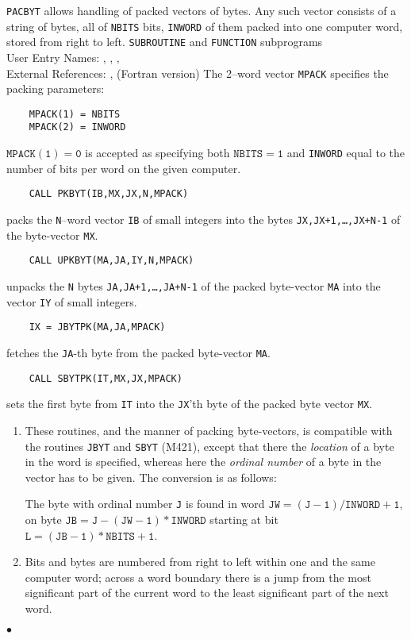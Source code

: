                           
              
\Submitter{}                               
      
{\tt PACBYT} allows handling of packed vectors of bytes. Any such
vector consists of a string of bytes, all of {\tt NBITS} bits,
{\tt INWORD} of them packed into one computer word,
stored from right to left.
\Structure
{\tt SUBROUTINE} and {\tt FUNCTION} subprograms \\
User Entry Names: , , ,
\\
External References:  ,  (Fortran
version)
\Usage
The 2--word vector {\tt MPACK} specifies the packing parameters:
\begin{verbatim}
    MPACK(1) = NBITS
    MPACK(2) = INWORD
\end{verbatim}
$\mathtt{MPACK(1)=0}$ is accepted as specifying both $\mathtt{NBITS=1}$ and
{\tt INWORD} equal to the number of bits per word on the given computer.
\begin{verbatim}
    CALL PKBYT(IB,MX,JX,N,MPACK)
\end{verbatim}
packs the {\tt N}--word vector {\tt IB} of small integers into the bytes
{\tt JX,JX+1,\ldots,JX+N-1} of the byte-vector {\tt MX}.
\begin{verbatim}
    CALL UPKBYT(MA,JA,IY,N,MPACK)
\end{verbatim}
unpacks the {\tt N} bytes {\tt JA,JA+1,\ldots,JA+N-1} of the packed
byte-vector {\tt MA} into the vector {\tt IY} of small integers.
\begin{verbatim}
    IX = JBYTPK(MA,JA,MPACK)
\end{verbatim}
fetches the {\tt JA}-th byte from the packed byte-vector {\tt MA}.
\begin{verbatim}
    CALL SBYTPK(IT,MX,JX,MPACK)
\end{verbatim}
sets the first byte from {\tt IT} into the {\tt JX}'th byte of the packed
byte vector {\tt MX}.
\Notes
\begin{enumerate}
\item These routines, and the manner of packing byte-vectors, is
compatible with the routines {\tt JBYT} and {\tt SBYT} (M421),
except that there the {\it location} of a byte in the word is specified,
whereas here the {\it ordinal number} of a byte in the vector has to be
given. The conversion is as follows:
\par
The byte with ordinal number {\tt J} is found in word
$\mathtt{JW=(J-1)/INWORD+1}$, \\
on byte $\mathtt{JB=J-(JW-1)*INWORD}$
starting at bit $\mathtt{L=(JB-1)*NBITS+1}$.
\item  Bits and bytes are numbered from right to left within one and
the same computer word; across a word boundary there is a jump from
the most significant part of the current word to the least
significant part of the next word.
\end{enumerate}
$\bullet$

